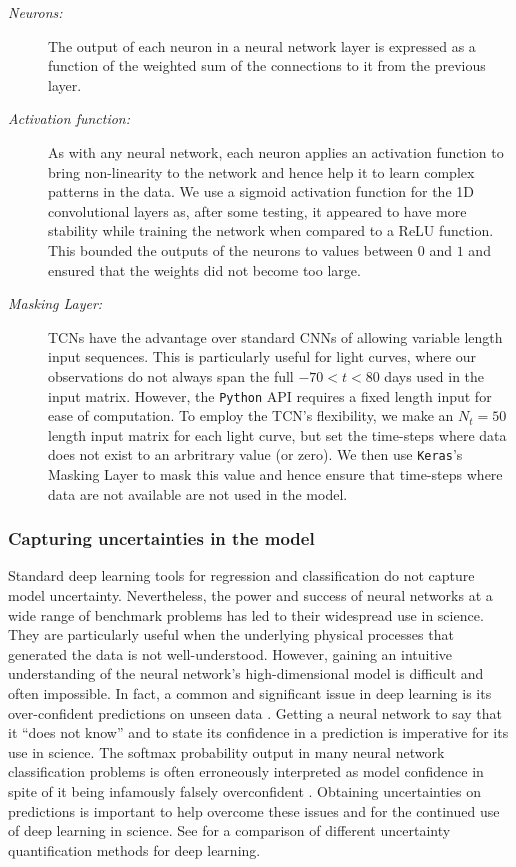 \documentclass[fleqn,usenatbib]{mnras}
\begin{document}
\begin{description}
    \item[\textit{Neurons:}]
    The output of each neuron in a neural network layer is expressed as a function of the weighted sum of the connections to it from the previous layer.
    \item[\textit{Activation function:}] 
    As with any neural network, each neuron applies an activation function to bring non-linearity to the network and hence help it to learn complex patterns in the data. We use a sigmoid activation function for the 1D convolutional layers as, after some testing, it appeared to have more stability while training the network when compared to a ReLU function. This bounded the outputs of the neurons to values between $0$ and $1$ and ensured that the weights did not become too large.
    \item[\textit{Masking Layer:}] TCNs have the advantage over standard CNNs of allowing variable length input sequences. This is particularly useful for light curves, where our observations do not always span the full $-70 < t < 80$ days used in the input matrix. However, the \texttt{Python} API requires a fixed length input for ease of computation. To employ the TCN's flexibility, we make an $N_t=50$ length input matrix for each light curve, but set the time-steps where data does not exist to an arbritrary value (or zero). We then use \texttt{Keras}'s Masking Layer to mask this value and hence ensure that time-steps where data are not available are not used in the model.

\end{description}



\subsubsection{Capturing uncertainties in the model}
\label{sec:NN_capturing_uncertatinties}
Standard deep learning tools for regression and classification do not capture model uncertainty. Nevertheless, the power and success of neural networks at a wide range of benchmark problems has led to their widespread use in science. They are particularly useful when the underlying physical processes that generated the data is not well-understood. However, gaining an intuitive understanding of the neural network's high-dimensional model is difficult and often impossible. In fact, a common and significant issue in deep learning is its over-confident predictions on unseen data \citep[e.g.][]{Guo2018CalibrationofNN}. Getting a neural network to say that it ``does not know'' and to state its confidence in a prediction is imperative for its use in science. The softmax probability output in many neural network classification problems is often erroneously interpreted as model confidence in spite of it being infamously falsely overconfident \citep[e.g.][]{Szegedy2014AdversarialAttacks,Goodfellow2015AdversarialAttacks,Gal2015}. Obtaining uncertainties on predictions is important to help overcome these issues and for the continued use of deep learning in science. See \citet{Caldeira_Nord2020} for a comparison of different uncertainty quantification methods for deep learning.
\end{document}
